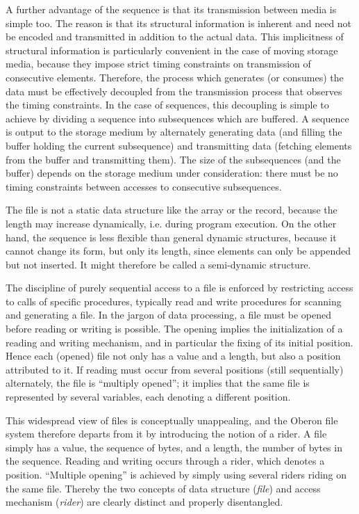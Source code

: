A further advantage of the sequence is that its transmission between media is simple too. The reason is that its structural information is inherent and need not be encoded and transmitted in addition to the actual data. This implicitness of structural information is particularly convenient in the case of moving storage media, because they impose strict timing constraints on transmission of consecutive elements. Therefore, the process which generates (or consumes) the data must be effectively decoupled from the transmission process that observes the timing constraints. In the case of sequences, this decoupling is simple to achieve by dividing a sequence into subsequences which are buffered. A sequence is output to the storage medium by alternately generating data (and filling the buffer holding the current subsequence) and transmitting data (fetching elements from the buffer and transmitting them). The size of the subsequences (and the buffer) depends on the storage medium under consideration: there must be no timing constraints between accesses to consecutive subsequences.

The file is not a static data structure like the array or the record, because the length may increase dynamically, i.e. during program execution. On the other hand, the sequence is less flexible than general dynamic structures, because it cannot change its form, but only its length, since elements can only be appended but not inserted. It might therefore be called a semi-dynamic structure.

The discipline of purely sequential access to a file is enforced by restricting access to calls of specific procedures, typically read and write procedures for scanning and generating a file. In the jargon of data processing, a file must be opened before reading or writing is possible. The opening implies the initialization of a reading and writing mechanism, and in particular the fixing of its initial position. Hence each (opened) file not only has a value and a length, but also a position attributed to it. If reading must occur from several positions (still sequentially) alternately, the file is ``multiply opened''; it implies that the same file is represented by several variables, each denoting a different position.

This widespread view of files is conceptually unappealing, and the Oberon file system therefore departs from it by introducing the notion of a rider. A file simply has a value, the sequence of bytes, and a length, the number of bytes in the sequence. Reading and writing occurs through a rider, which denotes a position. ``Multiple opening'' is achieved by simply using several riders riding on the same file. Thereby the two concepts of data structure (\emph{file}) and access mechanism (\emph{rider}) are clearly distinct and properly disentangled.

